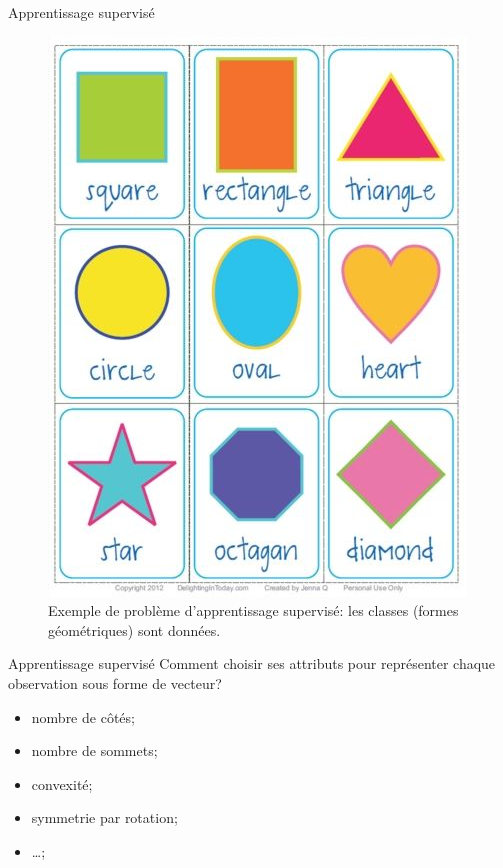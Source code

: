 \documentclass[8pt]{beamer}
\begin{document}
			\begin{frame}{Apprentissage supervisé}
				\begin{figure}[H]
					\includegraphics[height=.55\textheight]{images/samples/shapes_supervised}
					\caption*{Exemple de problème d'apprentissage supervisé: les classes (formes géométriques) sont données.}
				\end{figure}
			\end{frame}

			\begin{frame}{Apprentissage supervisé}
				Comment choisir ses attributs pour représenter chaque observation sous forme de vecteur?
				\begin{itemize}
					\item<2-> nombre de côtés;
					\item<3-> nombre de sommets;
					\item<4-> convexité;
					\item<5-> symmetrie par rotation;
					\item<6-> \dots;
				\end{itemize}
			\end{frame}
\end{document}

